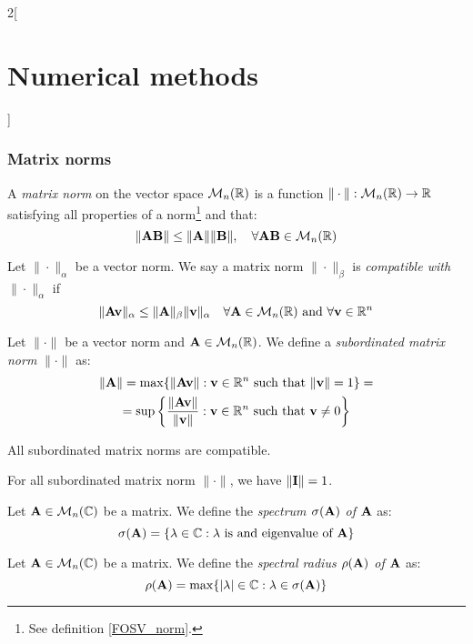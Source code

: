 \documentclass[../../../main.tex]{subfiles}
\begin{document}
\begin{multicols}{2}[\section{Numerical methods}]
\subsubsection*{Matrix norms}
\begin{definition}
    A \textit{matrix norm} on the vector space $\mathcal{M}_n(\mathbb{R})$ is a function $\|\cdot\|:\mathcal{M}_n(\mathbb{R})\rightarrow\mathbb{R}$ satisfying all properties of a norm\footnote{See definition \ref{FOSV_norm}.} and that: $$\|\vb{A}\vb{B}\|\leq\|\vb{A}\|\|\vb{B}\|,\quad\forall \vb{A}\vb{B}\in\mathcal{M}_n(\mathbb{R})$$
\end{definition}
\begin{definition}
    Let $\|\cdot\|_\alpha$ be a vector norm. We say a matrix norm $\|\cdot\|_\beta$ is \textit{compatible with $\|\cdot\|_\alpha$} if $$\|\vb{A}\vb{v}\|_\alpha\leq\|\vb{A}\|_\beta\|\vb{v}\|_\alpha\quad\forall\vb{A}\in\mathcal{M}_n(\mathbb{R})\text{ and }\forall\vb{v}\in\mathbb{R}^n$$
\end{definition}
\begin{definition}
    Let $\|\cdot\|$ be a vector norm and $\vb{A}\in\mathcal{M}_n(\mathbb{R})$. We define a \textit{subordinated matrix norm} $\|\cdot\|$ as:
    \begin{multline*}
        \|\vb{A}\|=\max\{\|\vb{A}\vb{v}\|:\vb{v}\in\mathbb{R}^n\text{ such that }\|\vb{v}\|=1\}=\\=\sup\left\{\frac{\|\vb{A}\vb{v}\|}{\|\vb{v}\|}:\vb{v}\in\mathbb{R}^n\text{ such that }\vb{v}\ne 0\right\}
    \end{multline*}
\end{definition}
\begin{lemma}
    All subordinated matrix norms are compatible.
\end{lemma}
\begin{lemma}
    For all subordinated matrix norm $\|\cdot\|$, we have $\|\vb{I}\|=1$.
\end{lemma}
\begin{definition}
    Let $\vb{A}\in\mathcal{M}_n(\mathbb{C})$ be a matrix. We define the \textit{spectrum $\sigma(\vb{A})$ of $\vb{A}$} as: $$\sigma(\vb{A})=\{\lambda\in\mathbb{C}:\lambda\text{ is and eigenvalue of }\vb{A}\}$$
\end{definition}
\begin{definition}
    Let $\vb{A}\in\mathcal{M}_n(\mathbb{C})$ be a matrix. We define the \textit{spectral radius $\rho(\vb{A})$ of $\vb{A}$} as: $$\rho(\vb{A})=\max\{|\lambda|\in\mathbb{C}:\lambda\in\sigma(\vb{A})\}$$

\end{definition}
\end{multicols}
\end{document}
